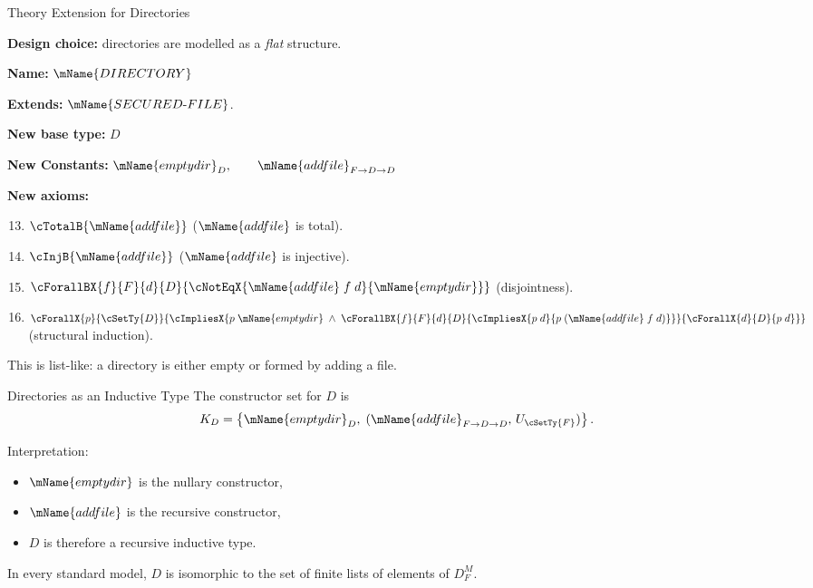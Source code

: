 \documentclass[aspectratio=169]{beamer}
\newcommand{\SECFILE}{\mName{SECURED\text{-}FILE}}
\newcommand{\DIR}{\mName{DIRECTORY}}
\begin{document}
\begin{frame}{Theory Extension for Directories}

\textbf{Design choice:} directories are modelled as a \emph{flat} structure.

\medskip
\textbf{Name:} $\DIR$

\textbf{Extends:} $\SECFILE$.

\textbf{New base type:} $D$

\textbf{New Constants:}
$\mName{emptydir}_D,\qquad
\mName{addfile}_{F \to D \to D}$

\textbf{New axioms:}
\begin{enumerate}\setcounter{enumi}{12}
    \item $\cTotalB{\mName{addfile}}$
      \hfill ($\mName{addfile}$ is total).
    \item $\cInjB{\mName{addfile}}$
      \hfill ($\mName{addfile}$ is injective).
    \item $\cForallBX{f}{F}{d}{D}{
      \cNotEqX{\mName{addfile}\;f\;d}{\mName{emptydir}}}$
      \hfill (disjointness).
    \item $\cForallX{p}{\cSetTy{D}}{
      \cImpliesX{p\;\mName{emptydir} \;\wedge\;
        \cForallBX{f}{F}{d}{D}{
          \cImpliesX{p\;d}{p\;(\mName{addfile}\;f\;d)}}}{
        \cForallX{d}{D}{p\;d}}}$
      \hfill (structural induction).
\end{enumerate}

\medskip
This is list-like: a directory is either empty or formed by adding a file.
\end{frame}

\begin{frame}{Directories as an Inductive Type}
The constructor set for $D$ is
\[
K_D = \left\{
\mName{emptydir}_D,\;
(\mName{addfile}_{F \to D \to D},\, U_{\cSetTy{F}})
\right\}.
\]

\medskip
Interpretation:
\begin{itemize}
  \item $\mName{emptydir}$ is the nullary constructor,
  \item $\mName{addfile}$ is the recursive constructor,
  \item $D$ is therefore a recursive inductive type.
\end{itemize}

\medskip
In every standard model, $D$ is isomorphic to the set of
finite lists of elements of $D_F^M$.
\end{frame}

\end{document}
